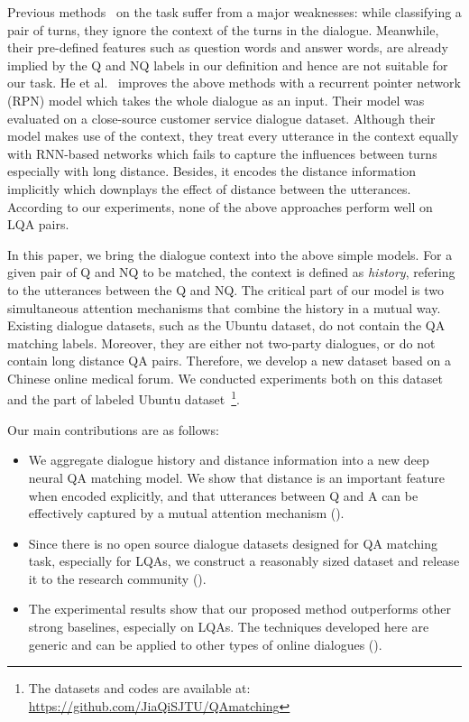 Previous methods~\cite{ding2008using,du2017discovering,jiang2018learning} on the task suffer from a major weaknesses: while classifying a pair of turns, they ignore the context of the turns in the dialogue. Meanwhile, their pre-defined features such as question words and answer words, are already implied by the Q and NQ labels in our definition and hence are not suitable for our task. He et al.~\cite{he2019learning} improves the above methods with a recurrent pointer network (RPN) model which takes the whole dialogue as an input. Their model was evaluated on a close-source customer service dialogue dataset. Although their model makes use of the context, they treat every utterance in the context equally with RNN-based networks which fails to capture the influences between turns especially with long distance. Besides, it encodes the distance information implicitly which downplays the effect of distance between the utterances. According to our experiments, none of the above approaches perform well on LQA pairs.


In this paper, we bring the dialogue context into the above simple models. 
For a given pair of Q and NQ to be matched, the context is defined as {\em history}, 
refering to the utterances between the Q and NQ. The critical part of our model 
is two simultaneous attention mechanisms that combine the history in a mutual way. 
Existing dialogue datasets, such as the Ubuntu dataset, do not contain
the QA matching labels. Moreover, they are either not two-party dialogues, or do not
contain long distance QA pairs. Therefore, we develop a new dataset based on
a Chinese online medical forum. We conducted experiments both on this dataset and the part of
labeled Ubuntu dataset~\footnote{The datasets and codes are available at: \url{https://github.com/JiaQiSJTU/QAmatching}}.  


Our main contributions are as follows:
\begin{itemize}

    \item We aggregate dialogue history and distance information into a new deep
neural QA matching model. We show that distance is an important feature when encoded explicitly, and that utterances between Q and A can be effectively captured by a mutual attention mechanism (). 
    \item Since there is no open source dialogue datasets designed for
QA matching task, especially for LQAs, 
we construct a reasonably sized dataset and release it to the research community (). 
    \item The experimental results show that our proposed method outperforms 
other strong baselines, especially on LQAs. 
The techniques developed here are generic and can
be applied to other types of online dialogues ().

\end{itemize}



